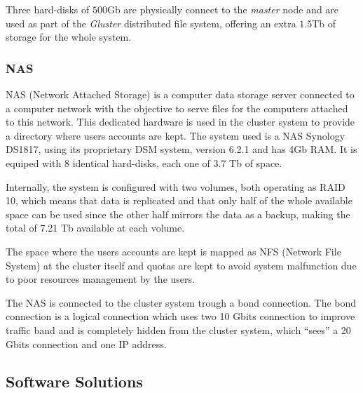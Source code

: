 \documentclass[twoside,a4paper,12pt,english]{inac19}
\begin{document}
Three hard-disks of $500$Gb are physically connect to the \textit{master} node and are used as part of the 
\textit{Gluster} distributed file system, offering
an extra $1.5$Tb of storage for the whole system.



\subsubsection{NAS}

NAS (Network Attached Storage) is a computer data storage server connected to a computer
network with the objective to serve files for the computers attached to this network. This
dedicated hardware is used in the cluster system to provide a directory where users accounts
are kept. The system used is a NAS Synology DS1817, using its proprietary DSM system, version
6.2.1 and has 4Gb RAM. It is equiped with 8 identical hard-disks, each one of 3.7 Tb of space.

Internally, the system is configured with two volumes, both operating as RAID 10,
which means that data is replicated and that only half of the whole available space
can be used since the other half mirrors the data as a backup, making the total
of 7.21 Tb available at each volume.

The space where the users accounts are kept is mapped as NFS (Network File System) at the
cluster itself and quotas are kept to avoid system malfunction due to poor resources management
by the users.

The NAS is connected to the cluster system trough a bond connection. The bond connection is a logical
connection which uses two 10 Gbits connection to improve traffic band and is completely hidden from
the cluster system, which ``sees'' a 20 Gbits connection and one IP address.




\subsection{Software Solutions}
\label{sub:ssol}
\end{document}
